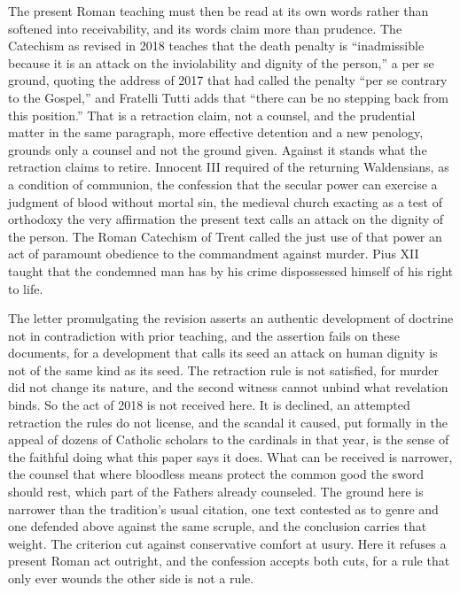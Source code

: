 \documentclass[11pt,twoside]{article}
\begin{document}
The present Roman teaching must then be read at its own words rather than softened into receivability, and its words claim more than prudence. The Catechism as revised in 2018 teaches that the death penalty is ``inadmissible because it is an attack on the inviolability and dignity of the person,'' a per se ground, quoting the address of 2017 that had called the penalty ``per se contrary to the Gospel,'' and Fratelli Tutti adds that ``there can be no stepping back from this position.'' That is a retraction claim, not a counsel, and the prudential matter in the same paragraph, more effective detention and a new penology, grounds only a counsel and not the ground given. Against it stands what the retraction claims to retire. Innocent III required of the returning Waldensians, as a condition of communion, the confession that the secular power can exercise a judgment of blood without mortal sin, the medieval church exacting as a test of orthodoxy the very affirmation the present text calls an attack on the dignity of the person. The Roman Catechism of Trent called the just use of that power an act of paramount obedience to the commandment against murder. Pius XII taught that the condemned man has by his crime dispossessed himself of his right to life.

The letter promulgating the revision asserts an authentic development of doctrine not in contradiction with prior teaching, and the assertion fails on these documents, for a development that calls its seed an attack on human dignity is not of the same kind as its seed. The retraction rule is not satisfied, for murder did not change its nature, and the second witness cannot unbind what revelation binds. So the act of 2018 is not received here. It is declined, an attempted retraction the rules do not license, and the scandal it caused, put formally in the appeal of dozens of Catholic scholars to the cardinals in that year, is the sense of the faithful doing what this paper says it does. What can be received is narrower, the counsel that where bloodless means protect the common good the sword should rest, which part of the Fathers already counseled. The ground here is narrower than the tradition's usual citation, one text contested as to genre and one defended above against the same scruple, and the conclusion carries that weight. The criterion cut against conservative comfort at usury. Here it refuses a present Roman act outright, and the confession accepts both cuts, for a rule that only ever wounds the other side is not a rule.
\end{document}
